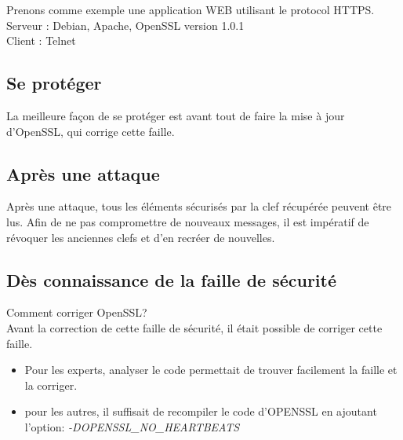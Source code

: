 \documentclass[a4paper,oneside,1pt]{article}
\begin{document}
Prenons comme exemple une application WEB utilisant le protocol HTTPS. \\
Serveur : Debian, Apache, OpenSSL version 1.0.1 \\
\linebreak
Client : Telnet \\


\subsection{Se protéger}

La meilleure façon de se protéger est avant tout de faire la mise à jour d'OpenSSL, qui corrige cette faille.
\subsection{Après une attaque}

Après une attaque, tous les éléments sécurisés par la clef récupérée peuvent être lus. Afin de ne pas compromettre de nouveaux messages, il est impératif de révoquer les anciennes clefs et d'en recréer de nouvelles. 

\subsection{Dès connaissance de la faille de sécurité}
Comment corriger OpenSSL?\\
Avant la correction de cette faille de sécurité, il était possible de corriger cette faille. 
\begin{itemize}
	\item Pour les experts, analyser le code permettait de trouver facilement la faille et la corriger. 
	\item pour les autres, il suffisait de recompiler le code d'OPENSSL en ajoutant l'option: \textit{-DOPENSSL\_NO\_HEARTBEATS}
\end{itemize}



\end{document}
